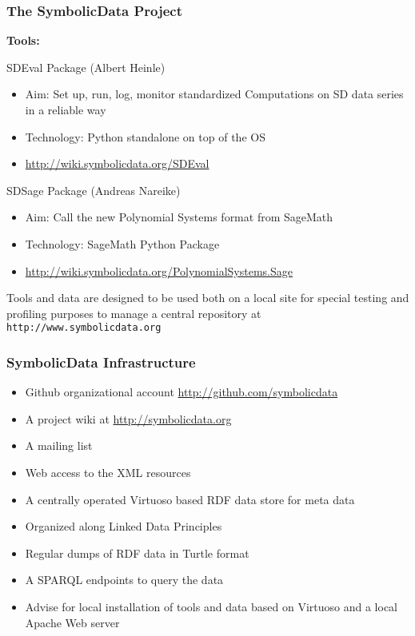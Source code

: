 \documentclass{beamer}
\begin{document}
\begin{frame}\frametitle{The SymbolicData Project}
\textbf{Tools:}\bigskip

SDEval Package (Albert Heinle)
\begin{itemize}\small
\item Aim: Set up, run, log, monitor standardized Computations on SD data
  series in a reliable way 
\item Technology: Python standalone on top of the OS
\item \url{http://wiki.symbolicdata.org/SDEval}
\end{itemize}
SDSage Package (Andreas Nareike)
\begin{itemize}\small
\item Aim: Call the new Polynomial Systems format from SageMath 
\item Technology: SageMath Python Package
\item \url{http://wiki.symbolicdata.org/PolynomialSystems.Sage}
\end{itemize}\vfill
Tools and data are designed to be used both on a local site for special testing
and profiling purposes to manage a central repository at
  \texttt{http://www.symbolicdata.org}
\end{frame}

\begin{frame}\frametitle{SymbolicData Infrastructure}
\begin{itemize}
\item Github organizational account \url{http://github.com/symbolicdata}
\item A project wiki at \url{http://symbolicdata.org}
\item A mailing list
\item Web access to the XML resources
\item A centrally operated Virtuoso based RDF data store for meta data
\item Organized along Linked Data Principles
\item Regular dumps of RDF data in Turtle format
\item A SPARQL endpoints to query the data
\item Advise for local installation of tools and data based on Virtuoso and a
  local Apache Web server
\end{itemize}
\end{frame}
\end{document}
